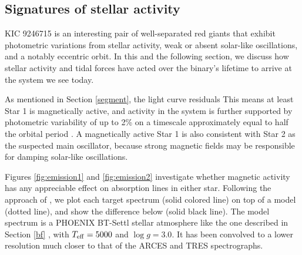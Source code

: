 \subsection{Signatures of stellar activity}\label{actrot}
KIC 9246715 is an interesting pair of well-separated red giants that exhibit photometric variations from stellar activity, weak or absent solar-like oscillations, and a notably eccentric orbit. In this and the following section, we discuss how stellar activity and tidal forces have acted over the binary's lifetime to arrive at the system we see today. 

As mentioned in Section \ref{segment}, the light curve residuals  This means at least Star 1 is magnetically active, and activity in the system is further supported by photometric variability of up to 2\% on a timescale approximately equal to half the orbital period \citep{gau14}. A magnetically active Star 1 is also consistent with Star 2 as the suspected main oscillator, because strong magnetic fields may be responsible for damping solar-like oscillations.

Figures \ref{fig:emission1} and \ref{fig:emission2} investigate whether magnetic activity has any appreciable effect on absorption lines in either star. Following the approach of \citet{fro12}, we plot each target spectrum (solid colored line) on top of a model (dotted line), and show the difference below (solid black line). The model spectrum is a PHOENIX BT-Settl stellar atmosphere like the one described in Section \ref{bf} \citep{all03,asp09}, with $T_{\rm{eff}} = 5000$ and $\log g = 3.0$. It has been convolved to a lower resolution much closer to that of the ARCES and TRES spectrographs.

